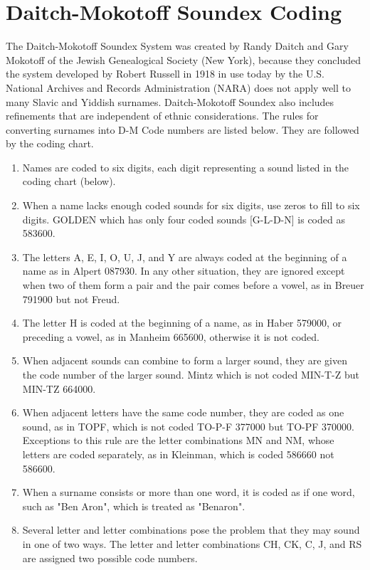 \documentclass[12pt,a4paper]{article}
\begin{document}
	\section{Daitch-Mokotoff Soundex Coding}
	
	The Daitch-Mokotoff Soundex System was created by Randy Daitch and Gary 
	Mokotoff of the Jewish Genealogical Society (New York), because they 
	concluded the system developed by Robert Russell in 1918 in use today by 
	the U.S. National Archives and Records Administration (NARA) does not apply
	well to many Slavic and Yiddish surnames.  Daitch-Mokotoff Soundex also 
	includes refinements that are independent of ethnic considerations.  The 
	rules for converting surnames into D-M Code numbers are listed below.  They
	are followed by the coding chart. 
	
	\begin{enumerate}
	\item Names are coded to six digits, each digit representing a sound listed 
	in the coding chart (below).
	
	\item When a name lacks enough coded sounds for six digits, use zeros to 
	fill to six digits.  GOLDEN which has only four coded sounds [G-L-D-N]
	is coded as 583600.
	
	\item The letters A, E, I, O, U, J, and Y are always coded at the beginning 
	of a name as in Alpert 087930.  In any other situation, they are 
	ignored except when two of them form a pair and the pair comes before 
	a vowel, as in Breuer 791900 but not Freud.
	
	\item The letter H is coded at the beginning of a name, as in Haber 579000, 
	or preceding a vowel, as in Manheim 665600, otherwise it is not coded.
	
	\item When adjacent sounds can combine to form a larger sound, they are 
	given the code number of the larger sound.  Mintz which is not coded 
	MIN-T-Z but MIN-TZ 664000. 
	
	\item When adjacent letters have the same code number, they are coded as one
	sound, as in TOPF, which is not coded TO-P-F 377000 but TO-PF 370000. 
	Exceptions to this rule are the letter combinations MN and NM, whose 
	letters are coded separately, as in Kleinman, which is coded 586660 
	not 586600. 
	\item When a surname consists or more than one word, it is coded as if one 
	word, such as "Ben Aron", which is treated as "Benaron". 
	
	\item Several letter and letter combinations pose the problem that they may 
	sound in one of two ways.  The letter and letter combinations CH, CK, 
	C, J, and RS are assigned two possible code numbers. 
	\end{enumerate}
	
\end{document}
